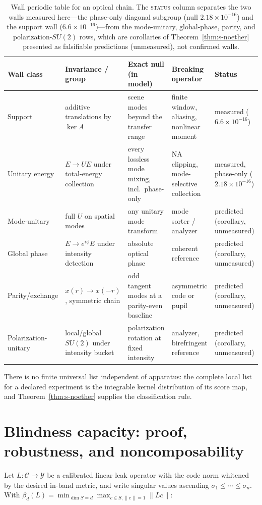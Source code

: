 \documentclass[10pt,onecolumn]{article}
\theoremstyle{plain}
\theoremstyle{definition}
\newcommand{\bd}{\beta}
\begin{document}
\begin{table}[t]
\centering
\caption{Wall periodic table for an optical chain. The \textsc{status} column
separates the two walls measured here---the phase-only diagonal subgroup (null
$2.18\times10^{-16}$) and the support wall ($6.6\times10^{-16}$)---from the
mode-unitary, global-phase, parity, and polarization-$SU(2)$ rows, which are
corollaries of Theorem~\ref{thm:s-noether} presented as falsifiable predictions
(unmeasured), not confirmed walls.}
\label{tab:s-walls}
\small
\begin{tabular}{@{}p{}p{}p{}p{}p{}@{}}
\toprule
Wall class & Invariance / group & Exact null (in model) & Breaking operator & Status \\
\midrule
Support & additive translations by $\ker A$ & scene modes beyond the transfer range
 & finite window, aliasing, nonlinear moment & measured ($6.6\times10^{-16}$) \\
Unitary energy & $E\!\to\!UE$ under total-energy collection & every lossless mode
 mixing, incl.\ phase-only & NA clipping, mode-selective collection & measured,
 phase-only ($2.18\times10^{-16}$) \\
Mode-unitary & full $U$ on spatial modes & any unitary mode transform & mode sorter /
 analyzer & predicted (corollary, unmeasured) \\
Global phase & $E\!\to\!e^{i\phi}E$ under intensity detection & absolute optical
 phase & coherent reference & predicted (corollary, unmeasured) \\
Parity/exchange & $x(r)\!\to\!x(-r)$, symmetric chain & odd tangent modes at a
 parity-even baseline & asymmetric code or pupil & predicted (corollary, unmeasured) \\
Polarization-unitary & local/global $SU(2)$ under intensity bucket & polarization
 rotation at fixed intensity & analyzer, birefringent reference & predicted
 (corollary, unmeasured) \\
\bottomrule
\end{tabular}
\end{table}

There is no finite universal list independent of apparatus: the complete local list
for a declared experiment is the integrable kernel distribution of its score map,
and Theorem~\ref{thm:s-noether} supplies the classification rule.

\section{Blindness capacity: proof, robustness, and noncomposability}\label{sec:s2}
Let $L:\mathcal C\to\mathcal Y$ be a calibrated linear leak operator with the code
norm whitened by the desired in-band metric, and write singular values ascending
$\sigma_1\le\cdots\le\sigma_n$. With
$\bd_d(L)=\min_{\dim S=d}\max_{c\in S,\lVert c\rVert=1}\lVert Lc\rVert$:
\end{document}
